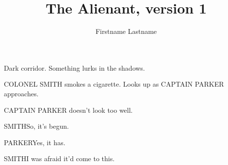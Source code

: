\documentclass{screenplay}
\title{The Alienant, version 1}
\author{Firstname Lastname}
\begin{document}
\coverpage
\fadein
{}

Dark corridor. Something lurks in the shadows.


COLONEL SMITH smokes a cigarette. Looks up as CAPTAIN PARKER approaches.

CAPTAIN PARKER doesn't look too well.

\begin{dialogue}{SMITH}So, it's begun.\end{dialogue}

\begin{dialogue}{PARKER}Yes, it has.\end{dialogue}

\begin{dialogue}{SMITH}I was afraid it'd come to this.\end{dialogue}

\theend
\end{document}
